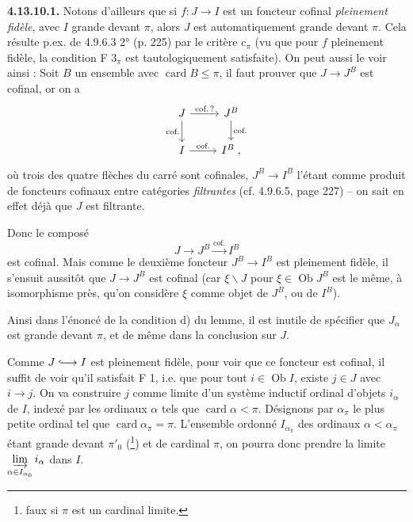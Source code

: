 \documentclass[11pt]{article}
\newcommand{\printedpage}[1]{\marginpar{\footnotesize p.~#1}}
\newcommand{\msp}[1]{\marginpar{\footnotesize [#1]}}
\newcommand{\incl}{\lhook\joinrel\longrightarrow}
\newcommand{\card}{\operatorname{card}}
\newcommand{\Ob}{\operatorname{Ob}}
\begin{document}
\textbf{4.13.10.1.} Notons d'ailleurs que si $f : J\longrightarrow I$ est un foncteur cofinal \textit{pleinement fidèle}, avec $I$ grande devant $\pi$, alors $J$ est automatiquement grande devant $\pi$. Cela résulte p.ex. de 4.9.6.3 2° (p. 225) par le critère $\mathrm{c}_\pi$ (vu que pour $f$ pleinement fidèle, la condition F $3_\pi$ est tautologiquement satisfaite). On peut aussi le voir ainsi : Soit $B$ un ensemble avec $\card B\leqslant\pi$, il faut prouver que $J\longrightarrow J^B$ est cofinal, or on a
\[
\begin{tikzcd}
J \arrow[r, "\text{cof.\,?}"] \arrow[d, "\text{cof.}"'] & J^B \arrow[d, "\text{cof.}"] \\
I \arrow[r, "\text{cof.}"] & I^B \; ,
\end{tikzcd}
\]
où trois des quatre flèches du carré sont cofinales, $J^B\longrightarrow I^B$ l'étant comme produit de foncteurs cofinaux entre catégories \textit{filtrantes} (cf. 4.9.6.5, page 227) -- on sait en effet déjà que $J$ est filtrante.

\msp{page 297}
Donc le composé
\[ J \longrightarrow J^B \xrightarrow{\text{cof.}} I^B \]
est cofinal. Mais comme le deuxième foncteur $J^B\longrightarrow I^B$ est pleinement fidèle, il s'ensuit aussitôt que $J\longrightarrow J^B$ est cofinal (car $\xi\backslash J$ pour $\xi\in\Ob J^B$ est le même, à isomorphisme près, qu'on considère $\xi$ comme objet de $J^B$, ou de $I^B$).

Ainsi dans l'énoncé de la condition d) du lemme, il est inutile de spécifier que $J_\alpha$ est grande devant $\pi$, et de même dans la conclusion sur $J$.

Comme $J\incl I$ est pleinement fidèle, pour voir que ce foncteur est cofinal, il suffit de voir qu'il satisfait F 1, i.e. que pour tout $i\in\Ob I$, existe $j\in J$ avec $i\longrightarrow j$. On va construire $j$ comme limite d'un système inductif ordinal d'objets $i_\alpha$ de $I$, indexé par les ordinaux $\alpha$ tels que $\card\alpha<\pi$. Désignons par $\alpha_\pi$ le plus petite ordinal tel que %
\printedpage{111}
\msp{page 298}
$\card\alpha_\pi=\pi$. L'ensemble ordonné $I_{\alpha_\pi}$ des ordinaux $\alpha<\alpha_\pi$ étant grande devant $\pi'_0$ (\footnote[129]{faux si $\pi$ est un cardinal limite.}) et de cardinal $\pi$, on pourra donc prendre la limite $\varinjlim\limits_{\alpha\in I_{\alpha_0}} i_\alpha$ dans $I$. %
\end{document}
